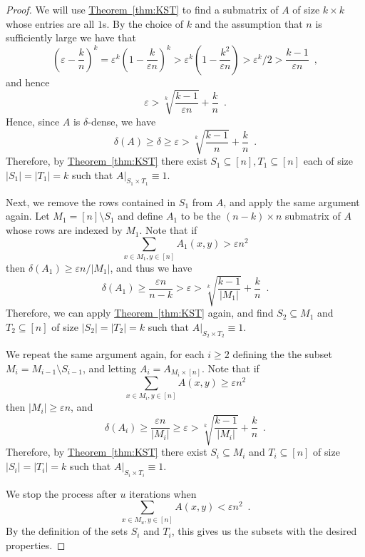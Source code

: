 \documentclass[11pt]{article}
\numberwithin{equation}{section}
\theoremstyle{definition}
\theoremstyle{plain}
\newcommand{\expref}[2]{\hyperref[#2]{#1~\ref{#2}}}
\theoremstyle{plain}
\newcommand{\colored}{}
\newcommand{\blocklength}{\colored{n}} %
\newcommand{\prox}{\colored{\delta}}
\newcommand{\numrect}{\colored{u}}
\newcommand{\eps}{\varepsilon}
\newcommand\abs[1]{\colored{\left|#1\right|}}
\begin{document}
   \begin{proof}
        We will use \expref{Theorem}{thm:KST} to find a submatrix
        of $A$ of size $k \times k$ whose entries are all $1$s.
        By the choice of $k$ and the assumption that $\blocklength$ is sufficiently large
        we have that
        \[
          \left(\eps - \frac{k}{n}\right)^k = \eps^k\left(1 - \frac{k}{\eps n}\right)^k > \eps^k\left(1 - \frac{k^2}{\eps n}\right) >\eps^k/2 > \frac{k-1}{\eps n}\enspace,
        \]
        and hence
        \[
          \eps > \sqrt[k]{\frac{k-1}{\eps n}} + \frac{k}{n}\enspace.
        \]
          Hence, since $A$ is $\prox$-dense, we have
          \[
            \delta(A) \geq \prox \geq \eps >
          \sqrt[k]{\frac{k-1}{\blocklength}} +
          \frac{k}{\blocklength}\enspace.
        \]
        Therefore, by \expref{Theorem}{thm:KST} there exist
        $S_1 \subseteq [\blocklength], T_1 \subseteq [\blocklength]$
        each of size $\abs{S_1} = \abs{T_1} = k$ such that
        $A \vert_{S_1 \times T_1} \equiv 1$.

        Next, we remove the rows contained in $S_1$ from $A$,
        and apply the same argument again.
        Let $M_1 = [\blocklength] \setminus S_1$ and
        define $A_1$ to be the $(\blocklength-k) \times \blocklength$ submatrix of $A$
        whose rows are indexed by $M_1$.
        Note that if
        \[
          \sum_{x \in M_1, y \in [\blocklength]}A_1(x,y) > \eps \blocklength^2
        \]
        then $\delta(A_1) \geq {\eps \blocklength}/{\abs{M_1}}$,
        and thus we have
        \[
          \delta(A_1) \geq \frac{\eps \blocklength}{\blocklength-k} >
        \eps > \sqrt[k]{\frac{k-1}{\abs{M_1}}} +
        \frac{k}{\blocklength}\enspace.
      \]
      Therefore, we can apply \expref{Theorem}{thm:KST} again, and
      find $S_2 \subseteq M_1$ and $T_2 \subseteq [\blocklength]$ of
      size $\abs{S_2} = \abs{T_2} = k$ such that
      $A \vert_{S_2 \times T_2} \equiv 1$.

        We repeat the same argument again,
        for each $i \geq 2$ defining the
        the subset $M_i = M_{i-1} \setminus S_{i-1}$,
        and letting $A_i = A_{M_i \times [\blocklength]}$.
        Note that if
        \[
          \sum_{x \in M_i, y \in [\blocklength]} A(x,y) \geq \eps \blocklength^2
        \]
        then $\abs{M_i} \geq \eps \blocklength$,
        and
        \[
          \delta(A_i) \geq \frac{\eps \blocklength}{\abs{M_i}} \geq \eps > \sqrt[k]{\frac{k-1}{\abs{M_i}}} + \frac{k}{\blocklength}\enspace.
        \]
        Therefore, by \expref{Theorem}{thm:KST} there exist $S_i \subseteq M_i$ and $T_i \subseteq [\blocklength]$
        of size $\abs{S_i} = \abs{T_i} = k$ such that  $A \vert_{S_i \times T_i} \equiv 1$.

        We stop the process after $\numrect$ iterations when
        \[
          \sum_{x \in M_{\numrect}, y \in [\blocklength]} A(x,y) < \eps \blocklength^2\enspace.
          \]
          By the %
          definition
%
%
of the sets $S_i$ and $T_i$,                    %
this gives us the subsets with the desired properties.
    \end{proof}
\end{document}
